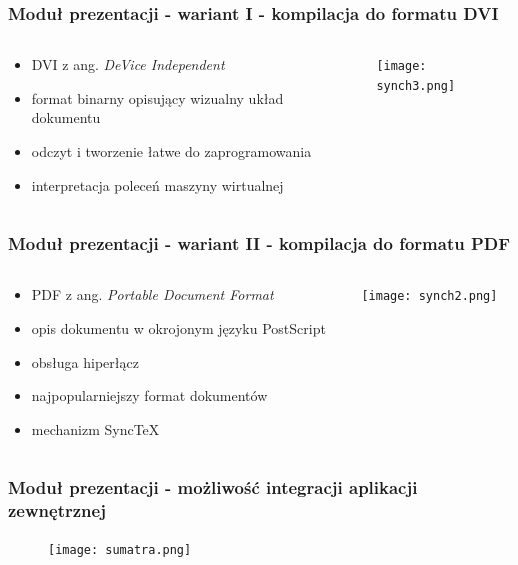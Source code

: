 \documentclass[t]{beamer}
\begin{document}
\begin{frame}
	\frametitle{Moduł prezentacji - wariant I - kompilacja do formatu DVI}
	\begin{columns}[T]
		\begin{column}{.70\textwidth}
			\begin{itemize}
				\item DVI z ang. \emph{DeVice Independent}
				\item format binarny opisujący wizualny układ dokumentu
				\item odczyt i tworzenie łatwe do zaprogramowania
				\item interpretacja poleceń maszyny wirtualnej
			\end{itemize}
		\end{column}
		\begin{column}{.3\textwidth}
			\texttt{[image: synch3.png]}
		\end{column}
	\end{columns}
\end{frame}

\begin{frame}
	\frametitle{Moduł prezentacji - wariant II - kompilacja do formatu PDF}
	\begin{columns}[T]
		\begin{column}{.70\textwidth}
			\begin{itemize}
				\item PDF z ang. \emph{Portable Document Format}
				\item opis dokumentu w okrojonym języku PostScript
				\item obsługa hiperłącz
				\item najpopularniejszy format dokumentów
				\item mechanizm SyncTeX
			\end{itemize}
		\end{column}
		\begin{column}{.3\textwidth}
			\texttt{[image: synch2.png]}
		\end{column}
	\end{columns}
\end{frame}

\begin{frame}
	\frametitle{Moduł prezentacji - możliwość integracji aplikacji zewnętrznej}
	\begin{figure}[htp]
		\centering
		\texttt{[image: sumatra.png]}
		\label{sum}
	\end{figure}
\end{frame}
\end{document}
